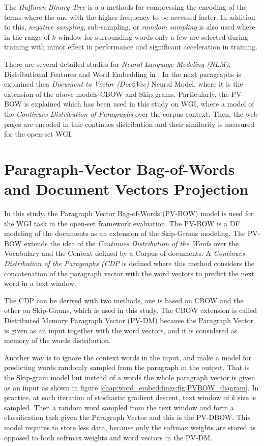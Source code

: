 The\textit{ Huffman Binary Tree} is a a methods for compressing the encoding of the terms where the one with the higher frequency to be accessed faster. In addition to this, \textit{negative sampling}, {sub-sampling}, or \textit{ramdom sampling} is also used where in the range of $k$ window for surrounding words only a few are selected during training with minor effect in  performance and significant acceleration in training. 

There are several detailed studies for \textit{Neural Language Modeling (NLM)}, Distributional Features and Word Embedding in \parencite{mitra2018introduction,mikolov2013efficient,mikolov2013distributed}. In the next paragraphs is explained thea \textit{Document to Vector (Doc2Vec)} Neural Model, where it is the extension of the above models CBOW and Skip-grams. Particularly, the PV-BOW is explained which has been used in this study on WGI, where a model of  the \textit{Continues Distribution of  Paragraphs} over the corpus context. Then, the web-pages are encoded in this continues distribution and their similarity is measured for the open-set WGI.
 
 
\section{Paragraph-Vector Bag-of-Words and Document Vectors Projection}
 
In this study, the Paragraph Vector Bag-of-Words (PV-BOW) model is used for the WGI task in the open-set framework evaluation. The PV-BOW is a DF modeling of the documents as an extension of the Skip-Grams modeling. The PV-BOW extends the idea of the \textit{Continues Distribution of the Words} over the Vocabulary and the Context defined by a Corpus of documents. A \textit{Continues Distribution of the Paragraphs (CDP} is defined where this method considers the concatenation of the paragraph vector with the word vectors to predict the next word in a text window. 
 
The CDP can be derived with two methods, one is based on CBOW and the other on Skip-Grams, which is used in this study. The CBOW extension is called Distributed Memory Paragraph Vector (PV-DM) because the Paragraph Vector is given as an input together with the word vectors, and it is considered as memory of the words distribution.
 
Another way is to ignore the context words in the input, and make a model for predicting words randomly sampled from the paragraph in the output. That is the Skip-gram model but instead of a words the whole paragraph vector is given as an input as shown in figure \ref{chap:word_embeddings:fig:PVBOW_diagram}. In practice, at each iteration of stochastic gradient descent, text window of $k$ size is sampled. Then a random word sampled from the text window and form a classification task given the Paragraph Vector and  this is the PV-DBOW. This model requires to store less data, because only the softmax weights are stored as opposed to both softmax weights and word vectors in the PV-DM. 



